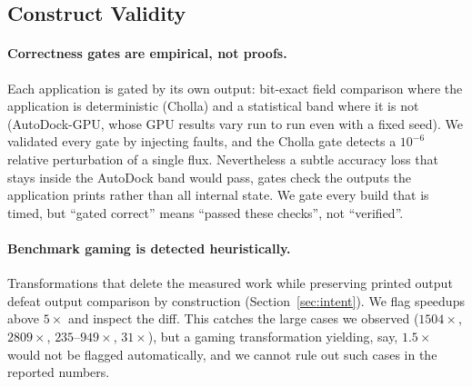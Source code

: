 \subsection{Construct Validity}
\paragraph{Correctness gates are empirical, not proofs.}
Each application is gated by its own output: bit-exact field comparison where the application is
deterministic (Cholla) and a statistical band where it is not (AutoDock-GPU, whose GPU results
vary run to run even with a fixed seed). We validated every gate by injecting faults, and the Cholla
gate detects a $10^{-6}$ relative perturbation of a single flux. Nevertheless a subtle accuracy loss
that stays inside the AutoDock band would pass, gates check the outputs the application prints rather
than all internal state. We gate every build that is timed, but ``gated correct'' means
``passed these checks'', not ``verified''.

\paragraph{Benchmark gaming is detected heuristically.}
Transformations that delete the measured work while preserving printed output defeat output comparison
by construction (Section~\ref{sec:intent}). We flag speedups above $5\times$ and inspect the diff. This
catches the large cases we observed ($1504\times$, $2809\times$, $235$--$949\times$, $31\times$), but a
gaming transformation yielding, say, $1.5\times$ would not be flagged automatically, and we cannot rule
out such cases in the reported numbers.

